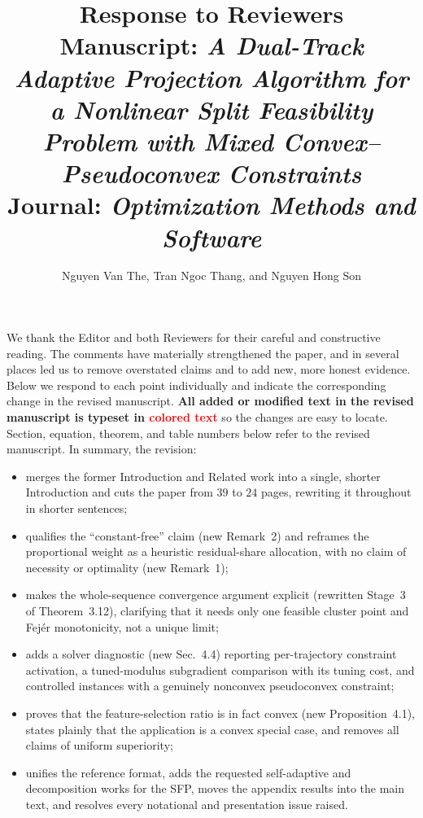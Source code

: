 \documentclass[11pt]{article}
\title{\vspace{-2em}Response to Reviewers\\[0.3em]
\large Manuscript: \emph{A Dual-Track Adaptive Projection Algorithm for a Nonlinear
Split Feasibility Problem with Mixed Convex--Pseudoconvex Constraints}\\[0.2em]
\normalsize Journal: \emph{Optimization Methods and Software}}
\author{Nguyen Van The, Tran Ngoc Thang, and Nguyen Hong Son}
\date{}
\begin{document}
\maketitle
\vspace{-2em}

\noindent We thank the Editor and both Reviewers for their careful and constructive
reading. The comments have materially strengthened the paper, and in several places led
us to remove overstated claims and to add new, more honest evidence. Below we respond to
each point individually and indicate the corresponding change in the revised manuscript.
\textbf{All added or modified text in the revised manuscript is typeset in
\textcolor{red}{colored text}} so the changes are easy to locate. Section, equation,
theorem, and table numbers below refer to the revised manuscript. In summary, the
revision:
\begin{itemize}[nosep]
  \item merges the former Introduction and Related work into a single, shorter
        Introduction and cuts the paper from $39$ to $24$ pages, rewriting it throughout
        in shorter sentences;
  \item qualifies the ``constant-free'' claim (new Remark~2) and reframes the proportional
        weight as a heuristic residual-share allocation, with no claim of necessity or
        optimality (new Remark~1);
  \item makes the whole-sequence convergence argument explicit (rewritten Stage~3 of
        Theorem~3.12), clarifying that it needs only one feasible cluster point and
        Fej\'er monotonicity, not a unique limit;
  \item adds a solver diagnostic (new Sec.~4.4) reporting per-trajectory constraint
        activation, a tuned-modulus subgradient comparison with its tuning cost, and
        controlled instances with a genuinely nonconvex pseudoconvex constraint;
  \item proves that the feature-selection ratio is in fact convex (new Proposition~4.1),
        states plainly that the application is a convex special case, and removes all
        claims of uniform superiority;
  \item unifies the reference format, adds the requested self-adaptive and decomposition
        works for the SFP, moves the appendix results into the main text, and resolves
        every notational and presentation issue raised.
\end{itemize}

\end{document}
